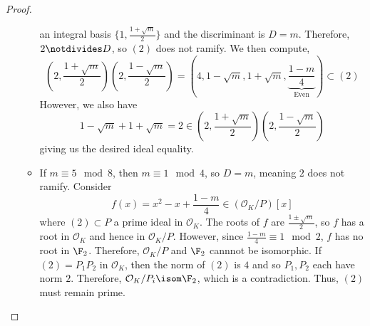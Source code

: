 \documentclass[11pt,leqno,oneside]{amsart}
\numberwithin{thm}{section}
\renewcommand{\O}{\mathcal{O}}
\begin{document}
\begin{proof}
\begin{itemize}
\begin{itemize}
      an integral basis \(\{1, \frac{1+\sqrt{m}}{2}\}\) and the
      discriminant is \(D = m\). Therefore, \(2 \notdivides D\), so
      \((2)\) does not ramify. We then compute, \[
        (2,\frac{1+\sqrt{m}}{2})(2,\frac{1-\sqrt{m}}{2}) =
        (4,1-\sqrt{m},1+\sqrt{m},
        \underbrace{\frac{1-m}{4}}_{\text{Even}}) \subset (2)
      \]
      However, we also have \[
        1-\sqrt{m} + 1+\sqrt{m} = 2 \in
        (2,\frac{1+\sqrt{m}}{2})(2,\frac{1-\sqrt{m}}{2}) 
      \]
      giving us the desired ideal equality.
    \item If \(m \equiv 5 \mod 8\), then \(m
      \equiv 1 \mod 4\), so \(D 
      = m\), meaning \(2\) does not ramify. Consider \[
        f(x) = x^2-x+\frac{1-m}{4} \in (\O_K/P)[x]
      \]
      where \((2) \subset P\) a prime ideal in \(\O_K\). The roots of
      \(f\) are \(\frac{1\pm\sqrt{m}}{2}\), so \(f\) has a root in
      \(\O_K\) and hence in \(\O_K/P\). However, since \(\frac{1-m}{4}
      \equiv 1 \mod 2\), \(f\) has no root in \(\F_2\). Therefore,
      \(\O_K/P\) and \(\F_2\) cannnot be isomorphic. If \((2) =
      P_1P_2\) in \(\O_K\), then the norm of \((2)\) is \(4\) and so
      \(P_1,P_2\) each have norm \(2\). Therefore, \(\O_K/P_i \isom
      \F_2\), which is a contradiction. Thus, \((2)\) must remain prime.
    \end{itemize}
  \end{itemize}
\end{proof}
\begin{bibdiv}
  \begin{biblist}
  \end{biblist}
\end{bibdiv}
\end{document}
